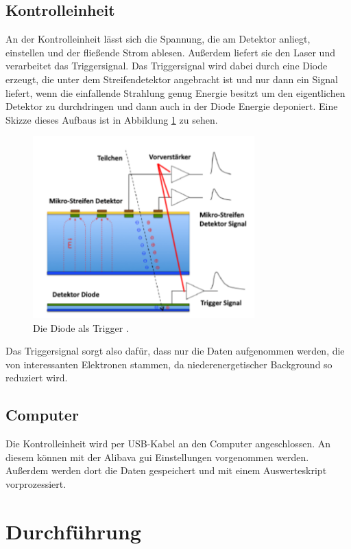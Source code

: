 \subsection{Kontrolleinheit}
An der Kontrolleinheit lässt sich die Spannung, die am Detektor anliegt, einstellen und der fließende Strom ablesen. Außerdem liefert sie den Laser und verarbeitet das Triggersignal. Das Triggersignal wird dabei durch eine Diode erzeugt, die unter dem Streifendetektor angebracht ist und nur dann ein Signal liefert, wenn die einfallende Strahlung genug Energie besitzt um den eigentlichen Detektor zu durchdringen und dann auch in der Diode Energie deponiert. Eine Skizze dieses Aufbaus ist in Abbildung \ref{fig:diodenTrigger} zu sehen.
\begin{figure}
  \centering
  \includegraphics[height=7cm]{TimosAufrisse/diodenTrigger.png}
  \caption{Die Diode als Trigger \cite{anleitung}.}
  \label{fig:diodenTrigger}
\end{figure}
Das Triggersignal sorgt also dafür, dass nur die Daten aufgenommen werden, die von interessanten Elektronen stammen, da niederenergetischer Background so reduziert wird.

\subsection{Computer}
Die Kontrolleinheit wird per USB-Kabel an den Computer angeschlossen. An diesem können mit der Alibava gui Einstellungen vorgenommen werden. Außerdem werden dort die Daten gespeichert und mit einem Auswerteskript vorprozessiert.




 \section{Durchführung}
\label{sec:Durchführung}

